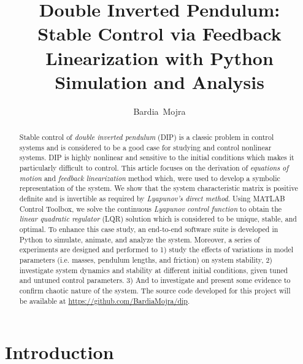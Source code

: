 \documentclass[journal]{IEEEtran}
\begin{document}
\title{Double Inverted Pendulum: \\
Stable Control via Feedback Linearization with
Python Simulation and Analysis}
\author{Bardia~Mojra}
\maketitle

\begin{abstract}
Stable control of \emph{double inverted pendulum} (DIP) is a classic problem in
control systems and is considered to be a good case for studying and control
nonlinear systems.
DIP is highly nonlinear and sensitive to
the initial conditions which makes it particularly difficult to control.
This article focuses on the derivation of
\emph{equations of motion} and \emph{feedback linearization} method which,
were used to develop a symbolic representation of the system. We show that the
system characteristic matrix is positive definite and is invertible as required
by \emph{Lyapunov's direct method}. Using MATLAB
Control Toolbox, we solve the continuous \emph{Lyapunov control function} to
obtain the \emph{linear quadratic regulator} (LQR) solution which is considered
to be unique, stable, and optimal. To enhance this case study,
an end-to-end software suite is developed in Python to simulate, animate, and
analyze the system.
Moreover, a series of experiments are designed and performed to 1) study the
effects of variations in model
parameters (i.e. masses, pendulum lengths, and friction) on system stability,
2) investigate system dynamics and stability at different initial conditions,
given tuned and
untuned control parameters. 3) And to investigate and present some evidence
to confirm chaotic nature of the system.
The source code developed for this project will be available at \href{https://github.com/BardiaMojra/dip}{https://github.com/BardiaMojra/dip}.
\end{abstract}



\section{Introduction}





\end{document}
